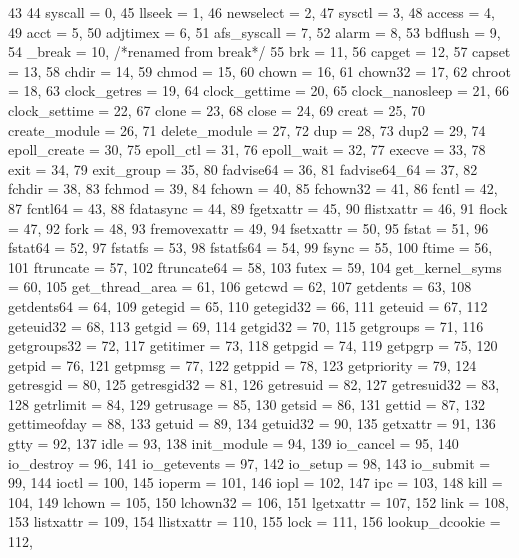 \begin{DoxyCode}
43          {
44         syscall = 0,
45     llseek = 1,
46     newselect = 2,
47     sysctl = 3,
48     access = 4,
49     acct = 5,
50     adjtimex = 6,
51     afs_syscall = 7,
52     alarm = 8,
53     bdflush = 9,
54     _break = 10, /*renamed from break*/
55     brk = 11,
56     capget = 12,
57     capset = 13,
58     chdir = 14,
59     chmod = 15,
60     chown = 16,
61     chown32 = 17,
62     chroot = 18,
63     clock_getres = 19,
64     clock_gettime = 20,
65     clock_nanosleep = 21,
66     clock_settime = 22,
67     clone = 23,
68     close = 24,
69     creat = 25,
70     create_module = 26,
71     delete_module = 27,
72     dup = 28,
73     dup2 = 29,
74     epoll_create = 30,
75     epoll_ctl = 31,
76     epoll_wait = 32,
77     execve = 33,
78     exit = 34,
79     exit_group = 35,
80     fadvise64 = 36,
81     fadvise64_64 = 37,
82     fchdir = 38,
83     fchmod = 39,
84     fchown = 40,
85     fchown32 = 41,
86     fcntl = 42,
87     fcntl64 = 43,
88     fdatasync = 44,
89     fgetxattr = 45,
90     flistxattr = 46,
91     flock = 47,
92     fork = 48,
93     fremovexattr = 49,
94     fsetxattr = 50,
95     fstat = 51,
96     fstat64 = 52,
97     fstatfs = 53,
98     fstatfs64 = 54,
99     fsync = 55,
100     ftime = 56,
101     ftruncate = 57,
102     ftruncate64 = 58,
103     futex = 59,
104     get_kernel_syms = 60,
105     get_thread_area = 61,
106     getcwd = 62,
107     getdents = 63,
108     getdents64 = 64,
109     getegid = 65,
110     getegid32 = 66,
111     geteuid = 67,
112     geteuid32 = 68,
113     getgid = 69,
114     getgid32 = 70,
115     getgroups = 71,
116     getgroups32 = 72,
117     getitimer = 73,
118     getpgid = 74,
119     getpgrp = 75,
120     getpid = 76,
121     getpmsg = 77,
122     getppid = 78,
123     getpriority = 79,
124     getresgid = 80,
125     getresgid32 = 81,
126     getresuid = 82,
127     getresuid32 = 83,
128     getrlimit = 84,
129     getrusage = 85,
130     getsid = 86,
131     gettid = 87,
132     gettimeofday = 88,
133     getuid = 89,
134     getuid32 = 90,
135     getxattr = 91,
136     gtty = 92,
137     idle = 93,
138     init_module = 94,
139     io_cancel = 95,
140     io_destroy = 96,
141     io_getevents = 97,
142     io_setup = 98,
143     io_submit = 99,
144     ioctl = 100,
145     ioperm = 101,
146     iopl = 102,
147     ipc = 103,
148     kill = 104,
149     lchown = 105,
150     lchown32 = 106,
151     lgetxattr = 107,
152     link = 108,
153     listxattr = 109,
154     llistxattr = 110,
155     lock = 111,
156     lookup_dcookie = 112,
}
\end{DoxyCode}
